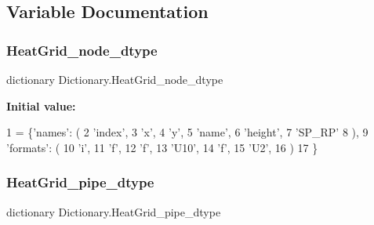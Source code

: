 \subsection{Variable Documentation}
\mbox{\label{namespace_dictionary_a302fe29521940f3c902f1d1be3652eea}} 
\subsubsection{\texorpdfstring{Heat\+Grid\+\_\+node\+\_\+dtype}{HeatGrid\_node\_dtype}}
{\footnotesize\ttfamily dictionary Dictionary.\+Heat\+Grid\+\_\+node\+\_\+dtype}

{\bfseries Initial value\+:}
\begin{DoxyCode}
1 =     \{\textcolor{stringliteral}{'names'}: (
2                                 \textcolor{stringliteral}{'index'},
3                                 \textcolor{stringliteral}{'x'},
4                                 \textcolor{stringliteral}{'y'},
5                                 \textcolor{stringliteral}{'name'},
6                                 \textcolor{stringliteral}{'height'},
7                                 \textcolor{stringliteral}{'SP\_RP'}
8                                 ),
9                        \textcolor{stringliteral}{'formats'}: (
10                                 \textcolor{stringliteral}{'i'},
11                                 \textcolor{stringliteral}{'f'},
12                                 \textcolor{stringliteral}{'f'},
13                                 \textcolor{stringliteral}{'U10'},
14                                 \textcolor{stringliteral}{'f'},
15                                 \textcolor{stringliteral}{'U2'},
16                                 )
17                                \}
\end{DoxyCode}
\mbox{\label{namespace_dictionary_a81817c3683d83c45721baf9ac7a0f324}} 
\subsubsection{\texorpdfstring{Heat\+Grid\+\_\+pipe\+\_\+dtype}{HeatGrid\_pipe\_dtype}}
{\footnotesize\ttfamily dictionary Dictionary.\+Heat\+Grid\+\_\+pipe\+\_\+dtype}

